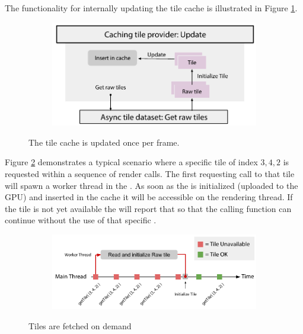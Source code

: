 The functionality for internally updating the tile cache is illustrated in Figure \ref{fig:cachingtileprovider_update}.

\begin{figure}[htbp]
    \centering
    \begin{subfigure}[bt]{0.8\textwidth}
        \includegraphics[width=\textwidth]{figures/implementation/tileprovider/cachingtileprovider_update.pdf}
    \end{subfigure}
    \caption{The tile cache is updated once per frame.}
    \label{fig:cachingtileprovider_update}
\end{figure}

Figure \ref{fig:cachingtileprovider_tilerequest} demonstrates a typical scenario where a specific tile of index ${3, 4, 2}$ is requested within a sequence of render calls. The first requesting call to that tile will spawn a worker thread in the . As soon as the  is initialized (uploaded to the GPU) and inserted in the cache it will be accessible on the rendering thread. If the tile is not yet available the  will report that so that the calling function can continue without the use of that specific .

\begin{figure}[htbp]
    \centering
    \begin{subfigure}[bt]{0.8\textwidth}
        \includegraphics[width=\textwidth]{figures/implementation/tileprovider/cachingtileprovider_tilerequest.pdf}
    \end{subfigure}
    \caption{Tiles are fetched on demand}
    \label{fig:cachingtileprovider_tilerequest}
\end{figure}

